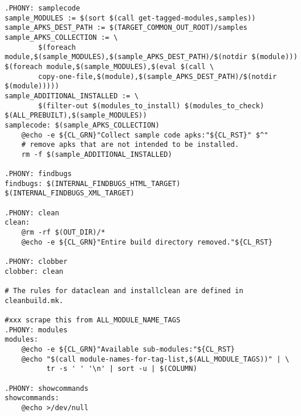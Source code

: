 \documentclass[12pt,a4paper]{article}
\begin{document}
\begin{verbatim}
.PHONY: samplecode
sample_MODULES := $(sort $(call get-tagged-modules,samples))
sample_APKS_DEST_PATH := $(TARGET_COMMON_OUT_ROOT)/samples
sample_APKS_COLLECTION := \
        $(foreach module,$(sample_MODULES),$(sample_APKS_DEST_PATH)/$(notdir $(module)))
$(foreach module,$(sample_MODULES),$(eval $(call \
        copy-one-file,$(module),$(sample_APKS_DEST_PATH)/$(notdir $(module)))))
sample_ADDITIONAL_INSTALLED := \
        $(filter-out $(modules_to_install) $(modules_to_check) $(ALL_PREBUILT),$(sample_MODULES))
samplecode: $(sample_APKS_COLLECTION)
	@echo -e ${CL_GRN}"Collect sample code apks:"${CL_RST}" $^"
	# remove apks that are not intended to be installed.
	rm -f $(sample_ADDITIONAL_INSTALLED)

.PHONY: findbugs
findbugs: $(INTERNAL_FINDBUGS_HTML_TARGET) $(INTERNAL_FINDBUGS_XML_TARGET)

.PHONY: clean
clean:
	@rm -rf $(OUT_DIR)/*
	@echo -e ${CL_GRN}"Entire build directory removed."${CL_RST}

.PHONY: clobber
clobber: clean

# The rules for dataclean and installclean are defined in cleanbuild.mk.

#xxx scrape this from ALL_MODULE_NAME_TAGS
.PHONY: modules
modules:
	@echo -e ${CL_GRN}"Available sub-modules:"${CL_RST}
	@echo "$(call module-names-for-tag-list,$(ALL_MODULE_TAGS))" | \
	      tr -s ' ' '\n' | sort -u | $(COLUMN)

.PHONY: showcommands
showcommands:
	@echo >/dev/null
\end{verbatim}
\label{5}
\end{document}
